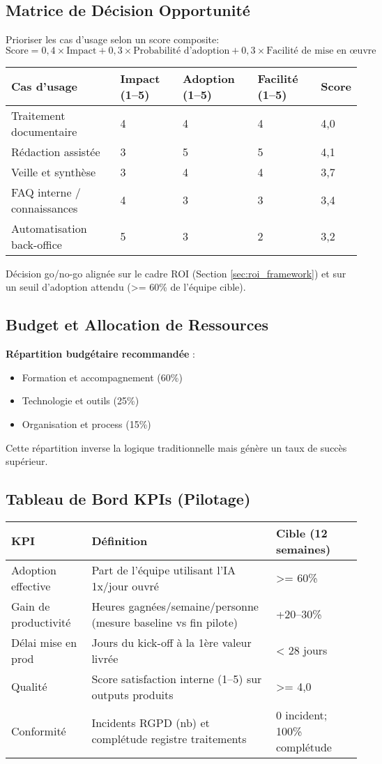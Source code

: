 \subsection{Matrice de Décision Opportunité}
Prioriser les cas d’usage selon un score composite:
\[
\text{Score} = 0{,}4 \times \text{Impact} + 0{,}3 \times \text{Probabilité d’adoption} + 0{,}3 \times \text{Facilité de mise en œuvre}
\]
\begin{longtable}{@{}p{6cm}p{2.2cm}p{2.6cm}p{2.4cm}p{2.4cm}@{}}
\toprule
\textbf{Cas d’usage} & \textbf{Impact (1–5)} & \textbf{Adoption (1–5)} & \textbf{Facilité (1–5)} & \textbf{Score} \\
\midrule
Traitement documentaire & 4 & 4 & 4 & 4{,}0 \\
Rédaction assistée & 3 & 5 & 5 & 4{,}1 \\
Veille et synthèse & 3 & 4 & 4 & 3{,}7 \\
FAQ interne / connaissances & 4 & 3 & 3 & 3{,}4 \\
Automatisation back-office & 5 & 3 & 2 & 3{,}2 \\
\bottomrule
\end{longtable}
Décision go/no-go alignée sur le cadre ROI (Section \ref{sec:roi_framework}) et sur un seuil d’adoption attendu (\textgreater{}= 60\% de l’équipe cible).

\subsection{Budget et Allocation de Ressources}

\textbf{Répartition budgétaire recommandée} :
\begin{itemize}
    \item Formation et accompagnement (60\%)
    \item Technologie et outils (25\%)
    \item Organisation et process (15\%)
\end{itemize}
Cette répartition inverse la logique traditionnelle mais génère un taux de succès supérieur.

\subsection{Tableau de Bord KPIs (Pilotage)}
\begin{longtable}{@{}p{5.4cm}p{5.4cm}p{5.4cm}@{}}
\toprule
\textbf{KPI} & \textbf{Définition} & \textbf{Cible (12 semaines)} \\
\midrule
Adoption effective & Part de l’équipe utilisant l’IA 1x/jour ouvré & \textgreater{}= 60\% \\
Gain de productivité & Heures gagnées/semaine/personne (mesure baseline vs fin pilote) & +20–30\% \\
Délai mise en prod & Jours du kick-off à la 1ère valeur livrée & \textless{} 28 jours \\
Qualité & Score satisfaction interne (1–5) sur outputs produits & \textgreater{}= 4{,}0 \\
Conformité & Incidents RGPD (nb) et complétude registre traitements & 0 incident; 100\% complétude \\
\bottomrule
\end{longtable}

